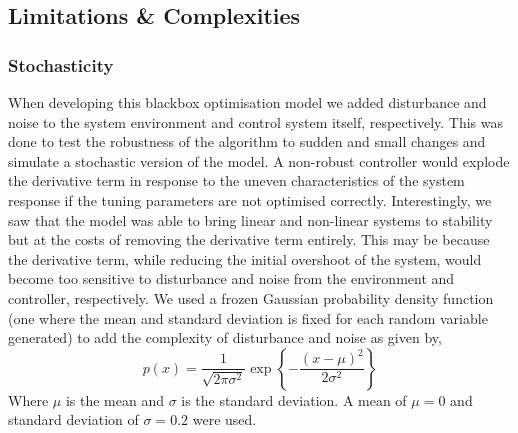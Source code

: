 \documentclass[conference]{IEEEtran}
\theoremstyle{definition}
\begin{document}
\subsection{Limitations \& Complexities}
\subsubsection{Stochasticity}
When developing this blackbox optimisation model we added disturbance and noise to the system environment and control system itself, respectively. This was done to test the robustness of the algorithm to sudden and small changes and simulate a stochastic version of the model. A non-robust controller would explode the derivative term in response to the uneven characteristics of the system response if the tuning parameters are not optimised correctly. Interestingly, we saw that the model was able to bring linear and non-linear systems to stability but at the costs of removing the derivative term entirely. This may be because the derivative term, while reducing the initial overshoot of the system, would become too sensitive to disturbance and noise from the environment and controller, respectively. We used a frozen Gaussian probability density function (one where the mean and standard deviation is fixed for each random variable generated) to add the complexity of disturbance and noise as given by,
\begin{equation}
    p(x) = \frac{1}{\sqrt{2\pi \sigma^2}} \exp{\left\{-\frac{ (x-\mu)^2}{2\sigma^2} \right\}}
\end{equation}
\vspace{1mm}
\noindent Where $\mu$ is the mean and $\sigma$ is the standard deviation. A mean of $\mu = 0$ and standard deviation of $\sigma = 0.2$ were used. 
\end{document}
